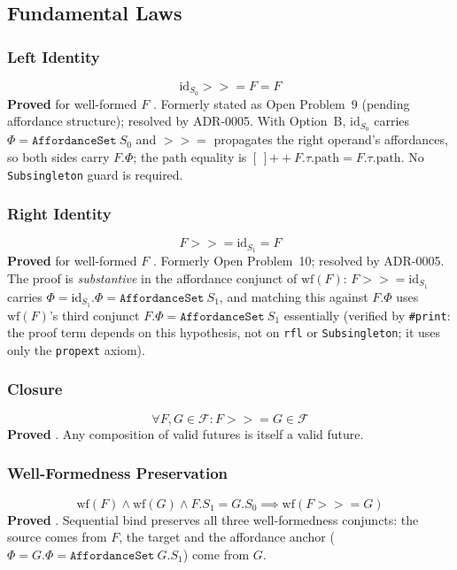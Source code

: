 \documentclass[11pt,a4paper]{article}
\newcommand{\Future}{\mathcal{F}}
\newcommand{\seqBind}{\mathbin{>>=}}
\newcommand{\id}{\text{id}}
\newcommand{\well}{\text{wf}}
\begin{document}
\subsection{Fundamental Laws}\label{sec:laws}

\subsubsection{Left Identity}
\[
\id_{S_0} \seqBind F = F
\]
\textbf{Proved} for well-formed $F$ .
Formerly stated as Open Problem~9 (pending affordance structure); resolved by
ADR-0005. With Option~B, $\id_{S_0}$ carries $\Phi = \texttt{AffordanceSet}~S_0$
and $\seqBind$ propagates the right operand's affordances, so both sides carry
$F.\Phi$; the path equality is $[\,]\mathbin{+\!\!+}F.\tau.\text{path} =
F.\tau.\text{path}$. No \texttt{Subsingleton} guard is required.

\subsubsection{Right Identity}
\[
F \seqBind \id_{S_1} = F
\]
\textbf{Proved} for well-formed $F$ .
Formerly Open Problem~10; resolved by ADR-0005. The proof is \emph{substantive}
in the affordance conjunct of $\well(F)$: $F \seqBind \id_{S_1}$ carries
$\Phi = \id_{S_1}.\Phi = \texttt{AffordanceSet}~S_1$, and matching this against
$F.\Phi$ uses $\well(F)$'s third conjunct $F.\Phi = \texttt{AffordanceSet}~S_1$
essentially (verified by \texttt{\#print}: the proof term depends on this
hypothesis, not on \texttt{rfl} or \texttt{Subsingleton}; it uses only the
\texttt{propext} axiom).

\subsubsection{Closure}
\[
\forall F, G \in \Future : F \seqBind G \in \Future
\]
\textbf{Proved} . Any composition of valid futures is itself a valid future.

\subsubsection{Well-Formedness Preservation}
\[
\well(F) \land \well(G) \land F.S_1 = G.S_0 \implies \well(F \seqBind G)
\]
\textbf{Proved} . Sequential
bind preserves all three well-formedness conjuncts: the source comes from $F$,
the target and the affordance anchor ($\Phi = G.\Phi = \texttt{AffordanceSet}~G.S_1$)
come from $G$.
\end{document}
